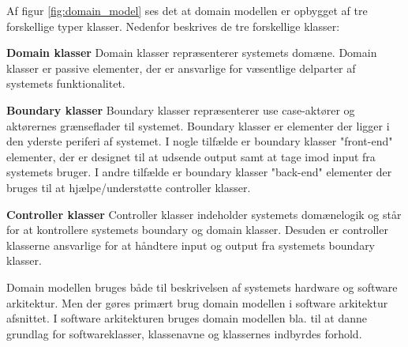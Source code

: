 \newpage

Af figur \ref{fig:domain_model} ses det at domain modellen er opbygget af tre forskellige typer klasser. Nedenfor beskrives de tre forskellige klasser:

\textbf{Domain klasser}\newline
Domain klasser repræsenterer systemets domæne. Domain klasser er passive elementer, der er ansvarlige for væsentlige delparter af systemets funktionalitet.  

\textbf{Boundary klasser}\newline
Boundary klasser repræsenterer use case-aktører og aktørernes grænseflader til systemet. Boundary klasser er elementer der ligger i den yderste periferi af systemet. I nogle tilfælde er boundary klasser "front-end" elementer, der er designet til at udsende output samt at tage imod input fra systemets bruger. I andre tilfælde er boundary klasser "back-end" elementer der bruges til at hjælpe/understøtte controller klasser.

\textbf{Controller klasser} \newline
Controller klasser indeholder systemets domænelogik og står for at kontrollere systemets boundary og domain klasser. Desuden er controller klasserne ansvarlige for at håndtere input og output fra systemets boundary klasser.

\vspace{1cm}

Domain modellen bruges både til beskrivelsen af systemets hardware og software arkitektur. Men der gøres primært brug domain modellen i software arkitektur afsnittet. I software arkitekturen bruges domain modellen bla. til at danne grundlag for softwareklasser, klassenavne og klassernes indbyrdes forhold.






